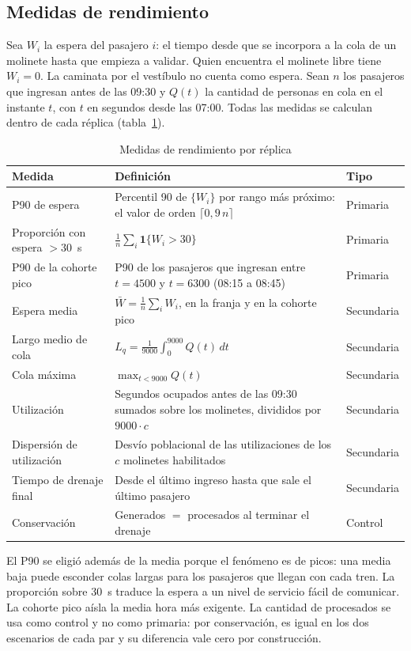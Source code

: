 \subsection{Medidas de rendimiento}

Sea $W_i$ la espera del pasajero $i$: el tiempo desde que se incorpora a la cola de un molinete hasta que
empieza a validar. Quien encuentra el molinete libre tiene $W_i = 0$. La caminata por el vestíbulo no
cuenta como espera. Sean $n$ los pasajeros que ingresan antes de las 09:30 y $Q(t)$ la cantidad de
personas en cola en el instante $t$, con $t$ en segundos desde las 07:00. Todas las medidas se calculan
dentro de cada réplica (tabla~\ref{tab:medidas}).

\begin{table}[H]
\centering
\caption{Medidas de rendimiento por réplica}
\label{tab:medidas}
\small
\begin{tabularx}{\textwidth}{@{}l X l@{}}
\toprule
Medida & Definición & Tipo \\
\midrule
P90 de espera & Percentil 90 de $\{W_i\}$ por rango más próximo: el valor de orden $\lceil 0{,}9\,n \rceil$ & Primaria \\
Proporción con espera $> 30$~s & $\frac{1}{n}\sum_i \mathbf{1}\{W_i > 30\}$ & Primaria \\
P90 de la cohorte pico & P90 de los pasajeros que ingresan entre $t = 4500$ y $t = 6300$ (08:15 a 08:45) & Primaria \\
Espera media & $\bar W = \frac{1}{n}\sum_i W_i$, en la franja y en la cohorte pico & Secundaria \\
Largo medio de cola & $L_q = \frac{1}{9000}\int_0^{9000} Q(t)\,dt$ & Secundaria \\
Cola máxima & $\max_{t < 9000} Q(t)$ & Secundaria \\
Utilización & Segundos ocupados antes de las 09:30 sumados sobre los molinetes, divididos por $9000 \cdot c$ & Secundaria \\
Dispersión de utilización & Desvío poblacional de las utilizaciones de los $c$ molinetes habilitados & Secundaria \\
Tiempo de drenaje final & Desde el último ingreso hasta que sale el último pasajero & Secundaria \\
Conservación & Generados $=$ procesados al terminar el drenaje & Control \\
\bottomrule
\end{tabularx}
\end{table}

El P90 se eligió además de la media porque el fenómeno es de picos: una media baja puede esconder colas
largas para los pasajeros que llegan con cada tren. La proporción sobre 30~s traduce la espera a un nivel
de servicio fácil de comunicar. La cohorte pico aísla la media hora más exigente. La cantidad de
procesados se usa como control y no como primaria: por conservación, es igual en los dos escenarios de
cada par y su diferencia vale cero por construcción.

